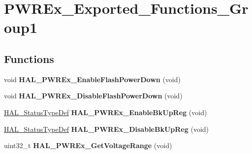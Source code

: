 \hypertarget{group___p_w_r_ex___exported___functions___group1}{}\section{P\+W\+R\+Ex\+\_\+\+Exported\+\_\+\+Functions\+\_\+\+Group1}
\label{group___p_w_r_ex___exported___functions___group1}
\subsection*{Functions}
\begin{DoxyCompactItemize}
\item 
void {\bfseries H\+A\+L\+\_\+\+P\+W\+R\+Ex\+\_\+\+Enable\+Flash\+Power\+Down} (void)\hypertarget{group___p_w_r_ex___exported___functions___group1_ga86c72a23f89c3c335ab784f42536b106}{}\label{group___p_w_r_ex___exported___functions___group1_ga86c72a23f89c3c335ab784f42536b106}

\item 
void {\bfseries H\+A\+L\+\_\+\+P\+W\+R\+Ex\+\_\+\+Disable\+Flash\+Power\+Down} (void)\hypertarget{group___p_w_r_ex___exported___functions___group1_ga12385932ad48ece7fde94d5c3db5cd19}{}\label{group___p_w_r_ex___exported___functions___group1_ga12385932ad48ece7fde94d5c3db5cd19}

\item 
\hyperlink{stm32f4xx__hal__def_8h_a63c0679d1cb8b8c684fbb0632743478f}{H\+A\+L\+\_\+\+Status\+Type\+Def} {\bfseries H\+A\+L\+\_\+\+P\+W\+R\+Ex\+\_\+\+Enable\+Bk\+Up\+Reg} (void)\hypertarget{group___p_w_r_ex___exported___functions___group1_ga21165778ccc2144040c6a935c9f794a7}{}\label{group___p_w_r_ex___exported___functions___group1_ga21165778ccc2144040c6a935c9f794a7}

\item 
\hyperlink{stm32f4xx__hal__def_8h_a63c0679d1cb8b8c684fbb0632743478f}{H\+A\+L\+\_\+\+Status\+Type\+Def} {\bfseries H\+A\+L\+\_\+\+P\+W\+R\+Ex\+\_\+\+Disable\+Bk\+Up\+Reg} (void)\hypertarget{group___p_w_r_ex___exported___functions___group1_gae1b50407389e3ce1132eceb013f823d1}{}\label{group___p_w_r_ex___exported___functions___group1_gae1b50407389e3ce1132eceb013f823d1}

\item 
uint32\+\_\+t {\bfseries H\+A\+L\+\_\+\+P\+W\+R\+Ex\+\_\+\+Get\+Voltage\+Range} (void)\hypertarget{group___p_w_r_ex___exported___functions___group1_ga2978c7160c8d166f1bf2bf39e4bf33f7}{}\label{group___p_w_r_ex___exported___functions___group1_ga2978c7160c8d166f1bf2bf39e4bf33f7}


\end{DoxyCompactItemize}
